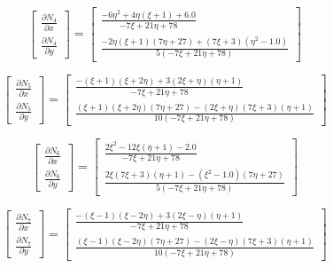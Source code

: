 \documentclass[a4paper, 12pt]{article}
\begin{document}
\begin{enumerate}
\begin{enumerate}
			\[
				\begin{bmatrix}
				\frac{\partial N_4}{\partial x} \\ 
				\frac{\partial N_4}{\partial y}
				\end{bmatrix}
				=
				\left[\begin{matrix}\frac{- 6\eta^{2} + 4\eta \left(\xi + 1\right) + 6.0}{- 7\xi + 21\eta + 78}\\\frac{- 2\eta \left(\xi + 1\right) \left(7\eta + 27\right) + \left(7\xi + 3\right) \left(\eta^{2} - 1.0\right)}{5 \left(- 7\xi + 21\eta + 78\right)}\end{matrix}\right]
			\]

			\[
				\begin{bmatrix}
				\frac{\partial N_5}{\partial x} \\ 
				\frac{\partial N_5}{\partial y}
				\end{bmatrix}
				=
				\left[\begin{matrix}\frac{- \left(\xi + 1\right) \left(\xi + 2\eta\right) + 3 \left(2\xi +\eta\right) \left(\eta + 1\right)}{- 7\xi + 21\eta + 78}\\\frac{\left(\xi + 1\right) \left(\xi + 2\eta\right) \left(7\eta + 27\right) - \left(2\xi +\eta\right) \left(7\xi + 3\right) \left(\eta + 1\right)}{10 \left(- 7\xi + 21\eta + 78\right)}\end{matrix}\right]
			\]

			\[
				\begin{bmatrix}
				\frac{\partial N_6}{\partial x} \\ 
				\frac{\partial N_6}{\partial y}
				\end{bmatrix}
				=
				\left[\begin{matrix}\frac{2\xi^{2} - 12\xi \left(\eta + 1\right) - 2.0}{- 7\xi + 21\eta + 78}\\\frac{2\xi \left(7\xi + 3\right) \left(\eta + 1\right) - \left(\xi^{2} - 1.0\right) \left(7\eta + 27\right)}{5 \left(- 7\xi + 21\eta + 78\right)}\end{matrix}\right]
			\]

			\[
				\begin{bmatrix}
				\frac{\partial N_7}{\partial x} \\ 
				\frac{\partial N_7}{\partial y}
				\end{bmatrix}
				=
				\left[\begin{matrix}\frac{- \left(\xi - 1\right) \left(\xi - 2\eta\right) + 3 \left(2\xi -\eta\right) \left(\eta + 1\right)}{- 7\xi + 21\eta + 78}\\\frac{\left(\xi - 1\right) \left(\xi - 2\eta\right) \left(7\eta + 27\right) - \left(2\xi -\eta\right) \left(7\xi + 3\right) \left(\eta + 1\right)}{10 \left(- 7\xi + 21\eta + 78\right)}\end{matrix}\right]
			\]


\end{enumerate}
\end{enumerate}
\end{document}
